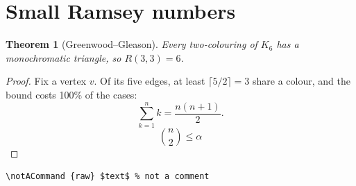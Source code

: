 \documentclass[11pt]{amsart}
\newtheorem{theorem}{Theorem}
\begin{document}
\section{Small Ramsey numbers}

\begin{theorem}[Greenwood--Gleason]
  Every two-colouring of $K_6$ has a monochromatic triangle, so $R(3,3) = 6$.
\end{theorem}

\begin{proof}
  Fix a vertex $v$. Of its five edges, at least \(\lceil 5/2 \rceil = 3\)
  share a colour, and the bound costs 100\% of the cases:
  \[
    \sum_{k=1}^{n} k = \frac{n(n+1)}{2}.
  \]
  $$\binom{n}{2} \leq \alpha$$
\end{proof}

\begin{verbatim}
\notACommand {raw} $text$ % not a comment
\end{verbatim}
\end{document}
